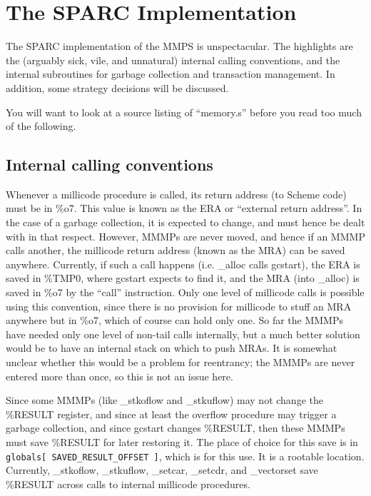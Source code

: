 \section{The SPARC Implementation}

The SPARC implementation of the MMPS is unspectacular. The highlights
are the (arguably sick, vile, and unnatural) internal calling
conventions, and the internal subroutines for garbage collection and
transaction management. In addition, some strategy decisions will be
discussed.

You will want to look at a source listing of ``memory.s'' before you
read too much of the following.


\subsection{Internal calling conventions}

Whenever a millicode procedure is called, its return address (to
Scheme code) must be in \%o7. This value is known as the ERA or
``external return address''. In the case of a garbage collection, it is
expected to change, and must hence be dealt with in that respect.
However, MMMPs are never moved, and hence if an MMMP calls another,
the millicode return address (known as the MRA) can be saved anywhere.
Currently, if such a call happens (i.e. \_alloc calls gcstart), the ERA
is saved in \%TMP0, where gcstart expects to find it, and the MRA (into
\_alloc) is saved in \%o7 by the ``call'' instruction. Only one level of
millicode calls is possible using this convention, since there is no
provision for millicode to stuff an MRA anywhere but in \%o7, which of
course can hold only one. So far the MMMPs have needed only one level
of non-tail calls internally, but a much better solution would be to
have an internal stack on which to push MRAs. It is somewhat unclear
whether this would be a problem for reentrancy; the MMMPs are never
entered more than once, so this is not an issue here.

Since some MMMPs (like \_stkoflow and \_stkuflow) may not change the
\%RESULT register, and since at least the overflow procedure may
trigger a garbage collection, and since gcstart changes \%RESULT, then
these MMMPs must save \%RESULT for later restoring it. The place of
choice for this save is in \verb+globals[ SAVED_RESULT_OFFSET ]+, which is
for this use. It is a rootable location. Currently, \_stkoflow,
\_stkuflow, \_setcar, \_setcdr, and \_vectorset save \%RESULT across calls
to internal millicode procedures.


